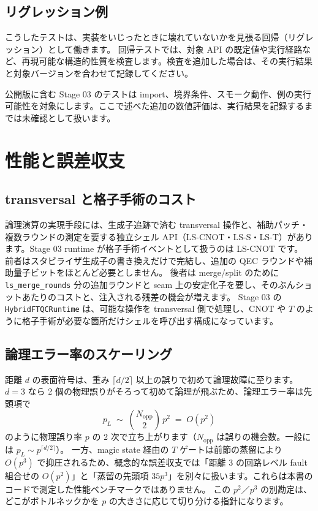 \subsection{リグレッション例}

こうしたテストは、実装をいじったときに壊れていないかを見張る回帰（リグレッション）として働きます。
回帰テストでは、対象 API の既定値や実行経路など、再現可能な構造的性質を検査します。検査を追加した場合は、その実行結果と対象バージョンを合わせて記録してください。

\begin{notebox}
  公開版に含む Stage 03 のテストは import、境界条件、スモーク動作、例の実行可能性を対象にします。ここで述べた追加の数値評価は、実行結果を記録するまでは未確認として扱います。
\end{notebox}

\section{性能と誤差収支}\label{sec:perf}

\subsection{transversal と格子手術のコスト}

論理演算の実現手段には、生成子追跡で済む transversal 操作と、補助パッチ・複数ラウンドの測定を要する独立シェル API（LS-CNOT・LS-S・LS-T）があります。Stage 03 runtime が格子手術イベントとして扱うのは LS-CNOT です。
前者はスタビライザ生成子の書き換えだけで完結し、追加の QEC ラウンドや補助量子ビットをほとんど必要としません。
後者は merge/split のために \texttt{ls\_merge\_rounds} 分の追加ラウンドと seam 上の安定化子を要し、そのぶんショットあたりのコストと、注入される残差の機会が増えます。
Stage 03 の \texttt{HybridFTQCRuntime} は、可能な操作を transversal 側で処理し、CNOT や $T$ のように格子手術が必要な箇所だけシェルを呼び出す構成になっています。

\subsection{論理エラー率のスケーリング}

距離 $d$ の表面符号は、重み $\lceil d/2 \rceil$ 以上の誤りで初めて論理故障に至ります。
$d=3$ なら 2 個の物理誤りがそろって初めて論理が飛ぶため、論理エラー率は先頭項で
\[
  p_L \;\sim\; \binom{N_{\mathrm{opp}}}{2}\, p^2 \;=\; O(p^2)
\]
のように物理誤り率 $p$ の 2 次で立ち上がります（$N_{\mathrm{opp}}$ は誤りの機会数。一般には $p_L \sim p^{\lceil d/2 \rceil}$）。
一方、magic state 経由の $T$ ゲートは前節の蒸留により $O(p^3)$ で抑圧されるため、概念的な誤差収支では「距離 3 の回路レベル fault 組合せの $O(p^2)$」と「蒸留の先頭項 $35p^3$」を別々に扱います。これらは本書のコードで測定した性能ベンチマークではありません。
この $p^2$／$p^3$ の別勘定は、どこがボトルネックかを $p$ の大きさに応じて切り分ける指針になります。

